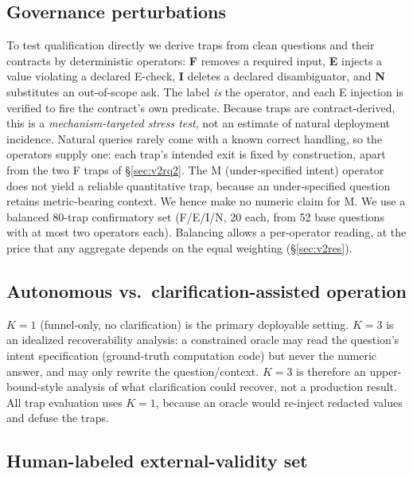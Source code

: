 \documentclass[sigconf]{acmart}
\begin{document}
\subsection{Governance perturbations}
To test qualification directly we derive traps from clean questions and their contracts by deterministic operators: \textbf{F} removes a required input, \textbf{E} injects a value violating a declared E-check, \textbf{I} deletes a declared disambiguator, and \textbf{N} substitutes an out-of-scope ask.
The label \emph{is} the operator, and each E injection is verified to fire the contract's own predicate.
Because traps are contract-derived, this is a \emph{mechanism-targeted stress test}, not an estimate of natural deployment incidence.
Natural queries rarely come with a known correct handling, so the operators supply one: each trap's intended exit is fixed by construction, apart from the two F traps of \S\ref{sec:v2rq2}.
The M (under-specified intent) operator does not yield a reliable quantitative trap, because an under-specified question retains metric-bearing context. We hence make no numeric claim for M.
We use a balanced 80-trap confirmatory set (F/E/I/N, 20 each, from 52 base questions with at most two operators each). Balancing allows a per-operator reading, at the price that any aggregate depends on the equal weighting (\S\ref{sec:v2res}).

\subsection{Autonomous vs.\ clarification-assisted operation}\label{sec:v2kmode}
$K{=}1$ (funnel-only, no clarification) is the primary deployable setting.
$K{=}3$ is an idealized recoverability analysis: a constrained oracle may read the question's intent specification (ground-truth computation code) but never the numeric answer, and may only rewrite the question/context.
$K{=}3$ is therefore an upper-bound-style analysis of what clarification could recover, not a production result. All trap evaluation uses $K{=}1$, because an oracle would re-inject redacted values and defuse the traps.


\subsection{Human-labeled external-validity set}\label{sec:v2ext}
\end{document}
